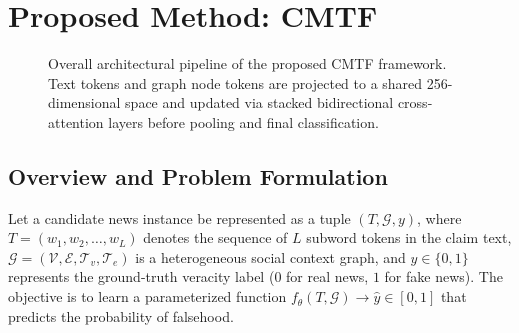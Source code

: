 \documentclass[conference]{IEEEtran}
\begin{document}
\section{Proposed Method: CMTF}

\begin{figure}[t]
\centering
{}
\caption{Overall architectural pipeline of the proposed CMTF framework. Text tokens and graph node tokens are projected to a shared 256-dimensional space and updated via stacked bidirectional cross-attention layers before pooling and final classification.}
\label{fig:architecture}
\end{figure}

\subsection{Overview and Problem Formulation}
Let a candidate news instance be represented as a tuple $(T, \mathcal{G}, y)$, where $T = (w_1, w_2, \dots, w_L)$ denotes the sequence of $L$ subword tokens in the claim text, $\mathcal{G} = (\mathcal{V}, \mathcal{E}, \mathcal{T}_v, \mathcal{T}_e)$ is a heterogeneous social context graph, and $y \in \{0, 1\}$ represents the ground-truth veracity label ($0$ for real news, $1$ for fake news). The objective is to learn a parameterized function $f_\theta(T, \mathcal{G}) \to \hat{y} \in [0, 1]$ that predicts the probability of falsehood.
\end{document}
